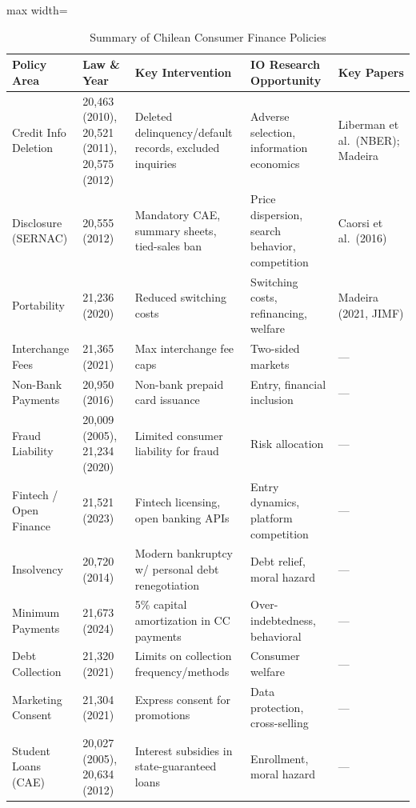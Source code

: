 \documentclass[12pt]{article}
\theoremstyle{plain}
\theoremstyle{plain}
\theoremstyle{definition}  %
\theoremstyle{remark}  %
\begin{document}
\begin{table}[H]
\centering
\caption{Summary of Chilean Consumer Finance Policies}
\label{tab:summary}
\footnotesize
\begin{adjustbox}{max width=\textwidth}
\begin{tabular}{p{3cm}p{2.5cm}p{4.5cm}p{4cm}p{2.5cm}}
\toprule
\textbf{Policy Area} & \textbf{Law \& Year} & \textbf{Key Intervention} & \textbf{IO Research Opportunity} & \textbf{Key Papers} \\
\midrule
Credit Info Deletion & 20,463 (2010), 20,521 (2011), 20,575 (2012) & Deleted delinquency/default records, excluded inquiries & Adverse selection, information economics & Liberman et al.\ (NBER); Madeira \\
\addlinespace
Disclosure (SERNAC) & 20,555 (2012) & Mandatory CAE, summary sheets, tied-sales ban & Price dispersion, search behavior, competition & Caorsi et al.\ (2016) \\
\addlinespace
Portability & 21,236 (2020) & Reduced switching costs & Switching costs, refinancing, welfare & Madeira (2021, JIMF) \\
\addlinespace
Interchange Fees & 21,365 (2021) & Max interchange fee caps & Two-sided markets & --- \\
\addlinespace
Non-Bank Payments & 20,950 (2016) & Non-bank prepaid card issuance & Entry, financial inclusion & --- \\
\addlinespace
Fraud Liability & 20,009 (2005), 21,234 (2020) & Limited consumer liability for fraud & Risk allocation & --- \\
\addlinespace
Fintech / Open Finance & 21,521 (2023) & Fintech licensing, open banking APIs & Entry dynamics, platform competition & --- \\
\addlinespace
Insolvency & 20,720 (2014) & Modern bankruptcy w/ personal debt renegotiation & Debt relief, moral hazard & --- \\
\addlinespace
Minimum Payments & 21,673 (2024) & 5\% capital amortization in CC payments & Over-indebtedness, behavioral & --- \\
\addlinespace
Debt Collection & 21,320 (2021) & Limits on collection frequency/methods & Consumer welfare & --- \\
\addlinespace
Marketing Consent & 21,304 (2021) & Express consent for promotions & Data protection, cross-selling & --- \\
\addlinespace
Student Loans (CAE) & 20,027 (2005), 20,634 (2012) & Interest subsidies in state-guaranteed loans & Enrollment, moral hazard & --- \\
\bottomrule
\end{tabular}
\end{adjustbox}
\end{table}
\end{document}
